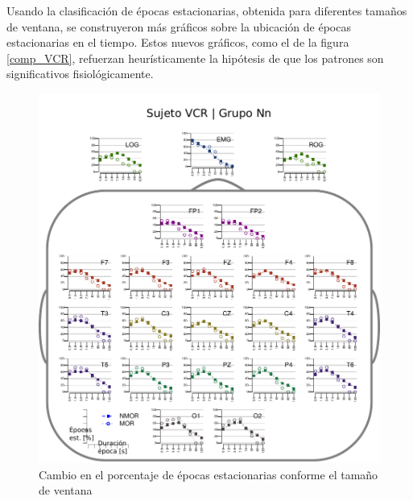 Usando la clasificación de épocas estacionarias, obtenida para diferentes tamaños de ventana,
se construyeron más gráficos sobre la ubicación de épocas estacionarias en el tiempo. Estos
nuevos
gráficos, como el de la figura \ref{comp_VCR}, refuerzan heurísticamente la hipótesis de que los 
patrones son significativos fisiológicamente. 

\begin{figure}
\centering
\includegraphics[width=.9\linewidth]{./img_resultados/cabeza_VCR.pdf}
\caption{Cambio en el porcentaje de épocas estacionarias conforme el tamaño de ventana}
\label{cabeza_repoio}
\end{figure}


